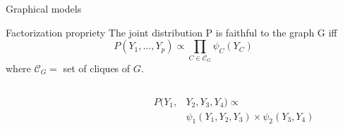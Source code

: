 \documentclass{beamer}
\newcommand{\Ccal}{\mathcal{C}}
\newcommand{\edgeunit}{1.5}
\begin{document}
\begin{frame}{Graphical models}
\begin{block}{Factorization propriety}
	The joint distribution P is faithful to the graph G iff \[ P(Y_1, \dots, Y_p) \propto \prod_{C \in \Ccal_G} \psi_C(Y_C) \]
  where $\Ccal_G =$ set of cliques of $G$.
\end{block}
\begin{columns}
\begin{column}{0.4\linewidth}
\flushright
{}\\
\end{column}
\begin{column}{0.6\linewidth}
\begin{align*}
	P(Y_1, &Y_2, Y_3, Y_4) \propto \\ 
	& \psi_1(Y_1 ,Y_2, Y_3) \times \psi_2(Y_3, Y_4)
\end{align*} 
\end{column}
\end{columns}
\end{frame}
\end{document}

